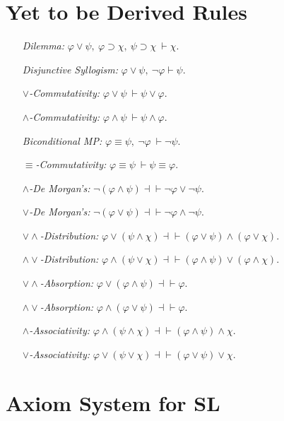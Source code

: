 \documentclass[a4paper, 11pt]{article} %
\begin{document}
\section*{Yet to be Derived Rules}

\begin{enumerate}[leftmargin=1.5in]
  \item[\it Dilemma:] $\varphi \vee \psi,\ \varphi \supset \chi,\ \psi \supset \chi\ \vdash \chi$.
  \item[\it Disjunctive Syllogism:] $\varphi \vee \psi,\ \neg \varphi \vdash \psi$.
  \item[\it $\vee$-Commutativity:] $\varphi \vee \psi\ \vdash \psi \vee \varphi$.
  \item[\it $\wedge$-Commutativity:] $\varphi \wedge \psi\ \vdash \psi \wedge \varphi$.
  \item[\it Biconditional MP:] $\varphi \equiv \psi,\ \neg\varphi\ \vdash \neg\psi$.
  \item[\it $\equiv$-Commutativity:] $\varphi \equiv \psi\ \vdash \psi \equiv \varphi$.
  \item[\it $\wedge$-De Morgan's:] $\neg(\varphi\wedge\psi)\dashv\vdash\neg\varphi\vee\neg\psi$.
  \item[\it $\vee$-De Morgan's:] $\neg(\varphi\vee\psi)\dashv\vdash\neg\varphi\wedge\neg\psi$.
  \item[\it ${\vee}{\wedge}$-Distribution:] $\varphi\vee(\psi\wedge\chi) \dashv\vdash (\varphi\vee\psi)\wedge(\varphi\vee\chi)$.
  \item[\it ${\wedge}{\vee}$-Distribution:] $\varphi\wedge(\psi\vee\chi) \dashv\vdash (\varphi\wedge\psi)\vee(\varphi\wedge\chi)$.
  \item[\it ${\vee}{\wedge}$-Absorption:] $\varphi\vee(\varphi\wedge\psi) \dashv\vdash \varphi$.
  \item[\it ${\wedge}{\vee}$-Absorption:] $\varphi\wedge(\varphi\vee\psi) \dashv\vdash \varphi$.
  \item[\it $\wedge$-Associativity:] $\varphi\wedge(\psi\wedge\chi) \dashv\vdash (\varphi\wedge\psi)\wedge\chi$.
  \item[\it $\vee$-Associativity:] $\varphi\vee(\psi\vee\chi) \dashv\vdash (\varphi\vee\psi)\vee\chi$.
\end{enumerate}




\section*{Axiom System for SL}
\end{document}
